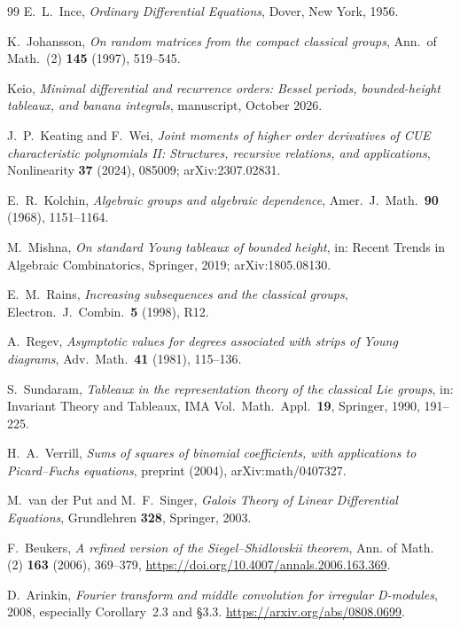 \documentclass[11pt,a4paper]{article}
\theoremstyle{definition}
\theoremstyle{remark}
\numberwithin{equation}{section}
\begin{document}
\begin{thebibliography}{99}
E.~L.~Ince, \emph{Ordinary Differential Equations}, Dover, New York, 1956.

K.~Johansson, \emph{On random matrices from the compact classical groups}, Ann.\ of Math.\ (2) \textbf{145} (1997), 519--545.

Keio, \emph{Minimal differential and recurrence orders: Bessel periods, bounded-height tableaux, and banana integrals}, manuscript, October 2026.

J.~P.~Keating and F.~Wei, \emph{Joint moments of higher order derivatives of CUE characteristic polynomials II: Structures, recursive relations, and applications}, Nonlinearity \textbf{37} (2024), 085009; arXiv:2307.02831.

E.~R.~Kolchin, \emph{Algebraic groups and algebraic dependence}, Amer.\ J.\ Math.\ \textbf{90} (1968), 1151--1164.

M.~Mishna, \emph{On standard Young tableaux of bounded height}, in: Recent Trends in Algebraic Combinatorics, Springer, 2019; arXiv:1805.08130.

E.~M.~Rains, \emph{Increasing subsequences and the classical groups}, Electron.\ J.\ Combin.\ \textbf{5} (1998), R12.

A.~Regev, \emph{Asymptotic values for degrees associated with strips of Young diagrams}, Adv.\ Math.\ \textbf{41} (1981), 115--136.

S.~Sundaram, \emph{Tableaux in the representation theory of the classical Lie groups}, in: Invariant Theory and Tableaux, IMA Vol.\ Math.\ Appl.\ \textbf{19}, Springer, 1990, 191--225.

H.~A.~Verrill, \emph{Sums of squares of binomial coefficients, with applications to Picard--Fuchs equations}, preprint (2004), arXiv:math/0407327.

M.~van der Put and M.~F.~Singer, \emph{Galois Theory of Linear Differential Equations}, Grundlehren \textbf{328}, Springer, 2003.

F.~Beukers, \emph{A refined version of the Siegel--Shidlovskii theorem},
Ann. of Math. (2) \textbf{163} (2006), 369--379,
\url{https://doi.org/10.4007/annals.2006.163.369}.

D.~Arinkin, \emph{Fourier transform and middle convolution for irregular
D-modules}, 2008, especially Corollary~2.3 and \S3.3.
\url{https://arxiv.org/abs/0808.0699}.


\end{thebibliography}
\end{document}
